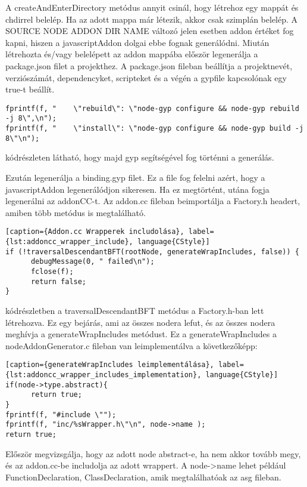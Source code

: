 A createAndEnterDirectory metódus annyit csinál, hogy létrehoz egy mappát és chdirrel belelép. Ha az adott mappa már létezik, akkor csak szimplán belelép.
A SOURCE NODE ADDON DIR NAME változó jelen esetben addon értéket fog kapni, hiszen a javascriptAddon dolgai ebbe fognak generálódni.
Miután létrehozta és/vagy belelépett az addon mappába először legenerálja a package.json filet a projekthez.
A package.json fileban beállítja a projektnevét, verziószámát, dependencyket, scripteket és a végén a gypfile kapcsolónak egy true-t beállít.
\begin{lstlisting}[caption={NodeAddonGenerator package.json scripts}, label={lst:nodeAddonGenerator_package_json}, language={CStyle}]
fprintf(f, "    \"rebuild\": \"node-gyp configure && node-gyp rebuild -j 8\",\n");
fprintf(f, "    \"install\": \"node-gyp configure && node-gyp build -j 8\"\n");
\end{lstlisting}
 kódrészleten látható, hogy majd gyp segítségével fog történni a generálás.

\noindent

Ezután legenerálja a binding.gyp filet. Ez a file fog felelni azért, hogy a javascriptAddon legenerálódjon sikeresen. Ha ez megtörtént, utána fogja legenerálni az addonCC-t.
Az addon.cc fileban beimportálja a Factory.h headert, amiben több metódus is megtalálható.
\begin{lstlisting}[caption={Addon.cc Wrapperek includolása}, label={lst:addoncc_wrapper_include}, language{CStyle}]
if (!traversalDescendantBFT(rootNode, generateWrapIncludes, false)) {
      debugMessage(0, " failed\n");
      fclose(f);
      return false;
}
\end{lstlisting}

 kódrészletben a traversalDescendantBFT metódus a Factory.h-ban lett létrehozva.
Ez egy bejárás, ami az összes nodera lefut, és az összes nodera meghívja a generateWrapIncludes metódust.
Ez a generateWrapIncludes a nodeAddonGenerator.c fileban van leimplementálva a következőképp:
\begin{lstlisting}[caption={generateWrapIncludes leimplementálása}, label={lst:addoncc_wrapper_includes_implementation}, language{CStyle}]
if(node->type.abstract){
      return true;
}
fprintf(f, "#include \"");
fprintf(f, "inc/%sWrapper.h\"\n", node->name );
return true;
\end{lstlisting}
Először megvizsgálja, hogy az adott node abstract-e, ha nem akkor tovább megy, és az addon.cc-be includolja az adott wrappert.
A node->name lehet például FunctionDeclaration, ClassDeclaration, amik megtalálhatóak az asg fileban.

